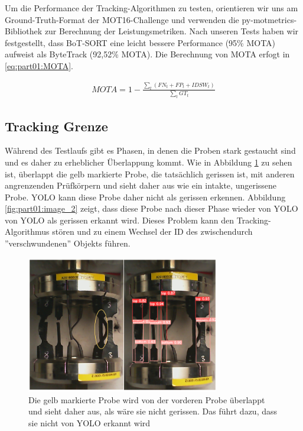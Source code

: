 Um die Performance der Tracking-Algorithmen zu testen, orientieren wir uns am Ground-Truth-Format der MOT16-Challenge \cite{milan2016mot16} und verwenden die py-motmetrics-Bibliothek \cite{py-motmetrics} zur Berechnung der Leistungsmetriken. Nach unseren Tests haben wir festgestellt, dass BoT-SORT eine leicht bessere Performance (95\% \acs{MOTA}) aufweist als ByteTrack (92,52\% \acs{MOTA}). Die Berechnung von \acs{MOTA} \cite{milan2016mot16} erfogt in \ref{eq:part01:MOTA}.

\begin{gather}
    MOTA = 1 - \frac{\sum_{t} (FN_t + FP_t + IDSW_t)}{\sum_{t}{GT_t}}
\label{eq:part01:MOTA}
\end{gather}

\subsection{Tracking Grenze}
Während des Testlaufs gibt es Phasen, in denen die Proben stark gestaucht sind und es daher zu erheblicher Überlappung kommt. Wie in Abbildung \ref{fig:part01:image_1} zu sehen ist, überlappt die gelb markierte Probe, die tatsächlich gerissen ist, mit anderen angrenzenden Prüfkörpern und sieht daher aus wie ein intakte, ungerissene Probe. YOLO kann diese Probe daher nicht als gerissen erkennen. Abbildung \ref{fig:part01:image_2} zeigt, dass diese Probe nach dieser Phase wieder von YOLO von YOLO als gerissen erkannt wird. Dieses Problem kann den Tracking-Algorithmus stören und zu einem Wechsel der ID des zwischendurch ''verschwundenen'' Objekts führen.

\begin{figure}[!htbp]
 \centering
 \includegraphics[width=0.75\textwidth]{gfx/image_1.png}
 \caption{Die gelb markierte Probe wird von der vorderen Probe überlappt und sieht daher aus, als wäre sie nicht gerissen. Das führt dazu, dass sie nicht von YOLO erkannt wird}
 \label{fig:part01:image_1}
\end{figure}


